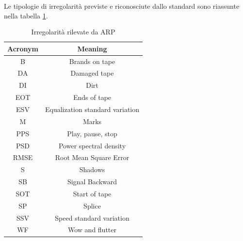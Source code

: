 Le tipologie di irregolarità previste e riconosciute dallo standard sono riassunte nella tabella \ref{tab:arp-irrs}.

\begin{table}[h]
    \centering
    \begin{tabular}{|c|c|}
        \hline
        \textbf{Acronym} &      \textbf{Meaning}\\
        \hline
        B       &   Brands on tape\\
        DA      &   Damaged tape\\
        DI      &   Dirt\\
        EOT     &   Ends of tape\\
        ESV     &   Equalization standard variation\\
        M       &   Marks\\
        PPS     &   Play, pause, stop\\
        PSD     &   Power spectral density\\
        RMSE    &   Root Mean Square Error\\
        S       &   Shadows\\
        SB      &   Signal Backward\\
        SOT     &   Start of tape\\
        SP      &   Splice\\
        SSV     &   Speed standard variation\\
        WF      &   Wow and flutter\\
        \hline
    \end{tabular}
    \caption{Irregolarità rilevate da \ac{ARP}} \cite[tab. 21-22]{ieeeStandard3302-2022}
    \label{tab:arp-irrs}
\end{table}



